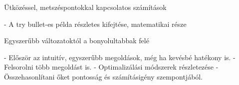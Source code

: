 \label{Chap:utkozesvizsgalat}

Ütközéssel, metszéspontokkal kapcsolatos számítások

- A try bullet-es példa részletes kifejtése, matematikai része

Egyszerűbb változatoktól a bonyolultabbak felé

- Először az intuitív, egyszerűbb megoldások, még ha kevésbé hatékony is.
- Felsorolni több megoldást is.
- Optimalizálási módszerek részletezése
- Összehasonlítani őket pontosság és számításigény szempontjából.
